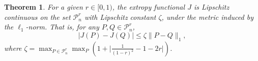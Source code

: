 \documentclass[pdflatex]{sn-jnl}%
\theoremstyle{thmstyleone}
\newtheorem{theorem}{Theorem}
\theoremstyle{thmstyletwo}%
\theoremstyle{thmstylethree}%
\begin{document}
\begin{theorem}\label{theoremlipschitz}
For a given \( r \in [0,1) \), the extropy functional \( J \) is Lipschitz continuous on the set \( \mathcal{P}^r_n \) with Lipschitz constant \( \zeta \), under the metric induced by the \( \ell_1 \)-norm. That is, for any \( P, Q \in \mathcal{P}^r_n \),
\[
|J(P) - J(Q)| \leq \zeta \|P - Q\|_1,
\]
where $\zeta=\max_{P\in \mathcal{P}^r_n}\max_{P}\left({1+\bigg|\frac{1}{{\left(1-r\right)}^2}-1-2r\bigg|}\right)$.
\end{theorem}




\end{document}
